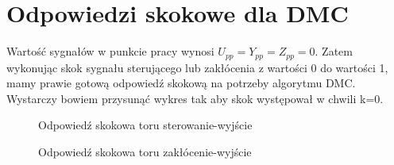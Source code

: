 
\chapter{Odpowiedzi skokowe dla DMC}
Wartość sygnałów w punkcie pracy wynosi $U_{pp}=Y_{pp}=Z_{pp}=0$. Zatem wykonując skok sygnału sterującego lub zakłócenia z wartości 0 do wartości 1,  mamy prawie gotową odpowiedź skokową na potrzeby algorytmu DMC. Wystarczy bowiem przysunąć wykres tak aby skok występował w chwili k=0.

\begin{figure}[H]
\centering

\caption{Odpowiedź skokowa toru sterowanie-wyjście}
\end{figure}

\begin{figure}[H]
\centering

\caption{Odpowiedź skokowa toru zakłócenie-wyjście}
\end{figure}